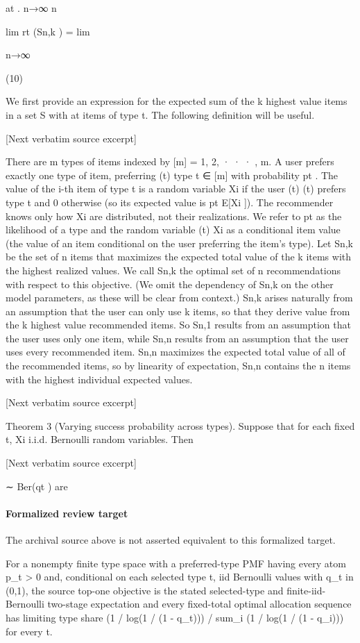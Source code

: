 \documentclass[10pt]{article}
\begin{document}
\begin{ReviewVerbatim}
at
.
n→∞ n

lim rt (Sn,k ) = lim

n→∞

(10)

We first provide an expression for the expected sum of the k highest value items in a set S with at items of
type t. The following definition will be useful.

[Next verbatim source excerpt]

There are m types of items indexed by [m] = {1, 2, · · · , m}. A user prefers exactly one type of item, preferring
(t)
type t ∈ [m] with probability pt . The value of the i-th item of type t is a random variable Xi if the user
(t)
(t)
prefers type t and 0 otherwise (so its expected value is pt E[Xi ]). The recommender knows only how Xi
are distributed, not their realizations. We refer to pt as the likelihood of a type and the random variable
(t)
Xi as a conditional item value (the value of an item conditional on the user preferring the item’s type).
Let Sn,k be the set of n items that maximizes the expected total value of the k items with the highest
realized values. We call Sn,k the optimal set of n recommendations with respect to this objective. (We omit
the dependency of Sn,k on the other model parameters, as these will be clear from context.)
Sn,k arises naturally from an assumption that the user can only use k items, so that they derive value
from the k highest value recommended items. So Sn,1 results from an assumption that the user uses only
one item, while Sn,n results from an assumption that the user uses every recommended item.
Sn,n maximizes the expected total value of all of the recommended items, so by linearity of expectation,
Sn,n contains the n items with the highest individual expected values.

[Next verbatim source excerpt]

Theorem 3 (Varying success probability across types). Suppose that for each fixed t, Xi
i.i.d. Bernoulli random variables. Then

[Next verbatim source excerpt]

∼ Ber(qt ) are
\end{ReviewVerbatim}


\paragraph{Formalized review target}
The archival source above is not asserted equivalent to this formalized target.
\begin{ReviewVerbatim}
For a nonempty finite type space with a preferred-type PMF having every atom p_t > 0 and, conditional on each selected type t, iid Bernoulli values with q_t in (0,1), the source top-one objective is the stated selected-type and finite-iid-Bernoulli two-stage expectation and every fixed-total optimal allocation sequence has limiting type share (1 / log(1 / (1 - q_t))) / sum_i (1 / log(1 / (1 - q_i))) for every t.
\end{ReviewVerbatim}
\end{document}

